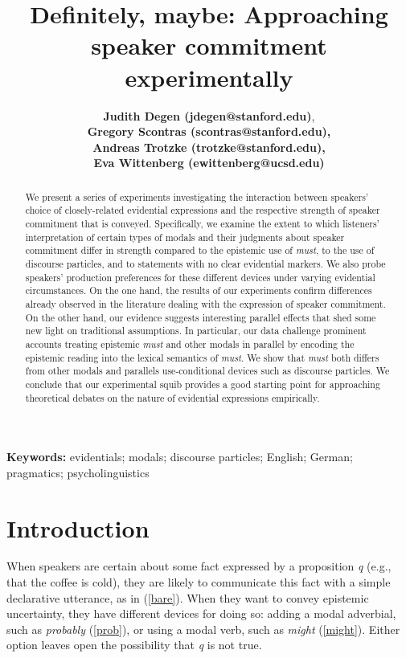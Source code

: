 \documentclass[11pt]{article}
\title{Definitely, maybe: Approaching speaker commitment experimentally}
\author{{\large \bf Judith Degen (jdegen@stanford.edu)}, \\ {\large \bf Gregory Scontras (scontras@stanford.edu),}\\ {\large \bf Andreas Trotzke (trotzke@stanford.edu),}\\ {\large \bf Eva Wittenberg (ewittenberg@ucsd.edu)}}
\begin{document}
\maketitle

\begin{abstract}

We present a series of experiments investigating the interaction between speakers’ choice of closely-related evidential expressions and the respective strength of speaker commitment that is conveyed. Specifically, we examine the extent to which listeners' interpretation of certain types of modals and their judgments about speaker commitment differ in strength compared to the epistemic use of \emph{must}, to the use of discourse particles, and to statements with no clear evidential markers. We also probe speakers' production preferences for these different devices under varying evidential circumstances. On the one hand, the results of our experiments confirm differences already observed in the literature dealing with the expression of speaker commitment. On the other hand, our evidence suggests interesting parallel effects that shed some new light on traditional assumptions. In particular, our data challenge prominent accounts treating epistemic \emph{must} and other modals in parallel by encoding the epistemic reading into the lexical semantics of \emph{must}. We show that \emph{must} both differs from other modals and parallels use-conditional devices such as discourse particles. We conclude that our experimental squib provides a good starting point for approaching theoretical debates on the nature of evidential expressions empirically.

\end{abstract}

\textbf{Keywords:} 
evidentials; modals; discourse particles; English; German; pragmatics; psycholinguistics


\section{Introduction}

When speakers are certain about some fact expressed by a proposition \emph{q} (e.g., that the coffee is cold), they are likely to communicate this fact with a simple declarative utterance, as in (\ref{bare}). When they want to convey epistemic uncertainty, they have different devices for doing so: adding a modal adverbial, such as \emph{probably} (\ref{prob}), or using a modal verb, such as \emph{might} (\ref{might}). Either option leaves open the possibility that \emph{q} is not true.
\end{document}
